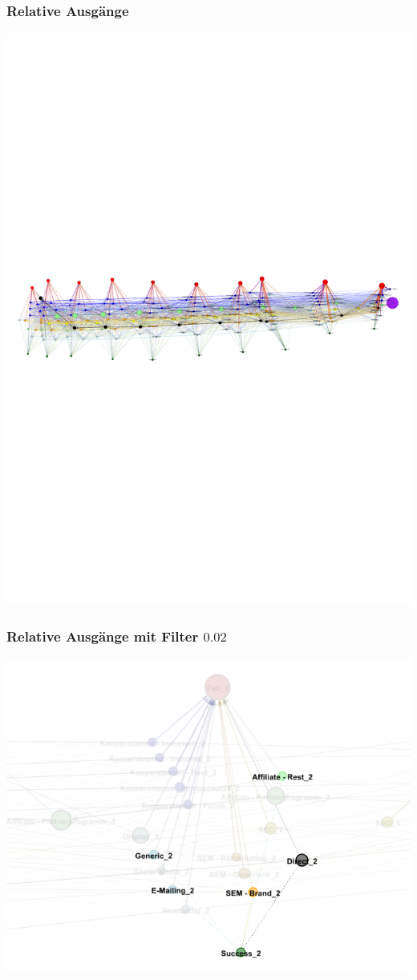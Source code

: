 \begin{frame}\frametitle{Relative Ausgänge}
	\centering\includegraphics[scale=1.75]{out_labels.pdf}
\end{frame}

\begin{frame}\frametitle{Relative Ausgänge mit Filter $0.02$}
	\centering\includegraphics[scale=0.3]{out_filter_2_succ.png}
\end{frame}

